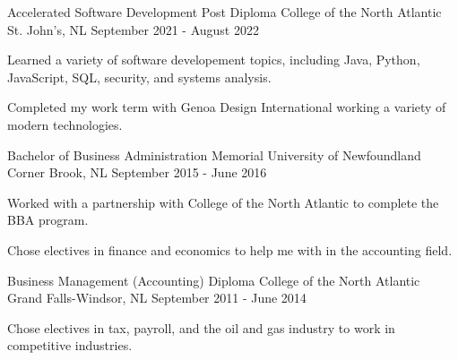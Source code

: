 

\begin{cventries}

  \cventry
    {Accelerated Software Development Post Diploma} %
    {College of the North Atlantic} %
    {St. John's, NL} %
    {September 2021 - August 2022} %
    {
      \begin{cvitems} %
        \item {Learned a variety of software developement topics, including Java, Python, JavaScript, SQL, security, and systems analysis.}
        \item {Completed my work term with Genoa Design International working a variety of modern technologies.}
      \end{cvitems}
    }
	
  \cventry
    {Bachelor of Business Administration} %
    {Memorial University of Newfoundland} %
    {Corner Brook, NL} %
    {September 2015 - June 2016} %
    {
      \begin{cvitems} %
        \item {Worked with a partnership with College of the North Atlantic to complete the BBA program.}
		\item {Chose electives in finance and economics to help me with in the accounting field.}
      \end{cvitems}
    }
	
  \cventry
    {Business Management (Accounting) Diploma} %
    {College of the North Atlantic} %
    {Grand Falls-Windsor, NL} %
    {September 2011 - June 2014} %
    {
      \begin{cvitems} %
        \item {Chose electives in tax, payroll, and the oil and gas industry to work in competitive industries.}
      \end{cvitems}
    }

\end{cventries}
